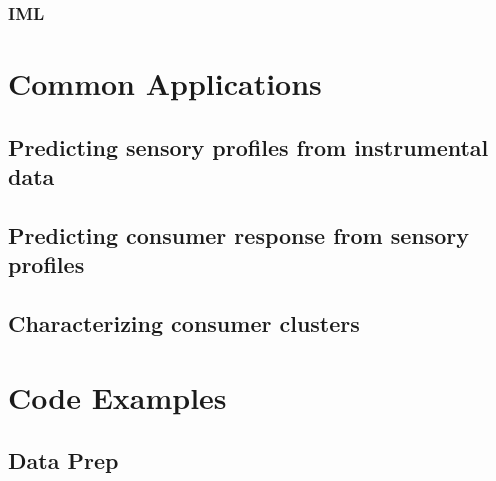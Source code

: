 \documentclass[
]{book}
\begin{document}
\hypertarget{iml}{%
\subsubsection{IML}\label{iml}}

\hypertarget{common-applications}{%
\section{Common Applications}\label{common-applications}}

\hypertarget{predicting-sensory-profiles-from-instrumental-data}{%
\subsection{Predicting sensory profiles from instrumental data}\label{predicting-sensory-profiles-from-instrumental-data}}

\hypertarget{predicting-consumer-response-from-sensory-profiles}{%
\subsection{Predicting consumer response from sensory profiles}\label{predicting-consumer-response-from-sensory-profiles}}

\hypertarget{characterizing-consumer-clusters}{%
\subsection{Characterizing consumer clusters}\label{characterizing-consumer-clusters}}

\hypertarget{code-examples}{%
\section{Code Examples}\label{code-examples}}

\hypertarget{data-prep-1}{%
\subsection{Data Prep}\label{data-prep-1}}
\end{document}
